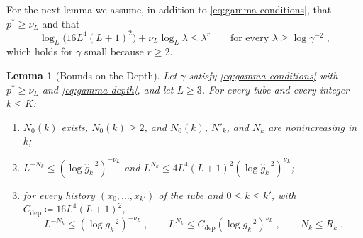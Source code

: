 \documentclass[11pt]{preprint}
\numberwithin{equation}{section}
\newtheorem{lemma}[theorem]{Lemma}
\theoremstyle{definition}
\theoremstyle{remark}
\theoremstyle{plain}
\begin{document}
For the next lemma we assume, in addition to \eqref{eq:gamma-conditions}, that $p^* \geq \nu_L$ and that
\begin{equation}\label{eq:gamma-depth}
    \log_L\bigl(16L^4(L + 1)^2\bigr) + \nu_L\log_L\lambda \leq \lambda^r
    \qquad\text{for every } \lambda \geq \log\gamma^{-2}\;,
\end{equation}
which holds for $\gamma$ small because $r \geq 2$.

\begin{lemma}[Bounds on the Depth]\label{lem:depth}
Let $\gamma$ satisfy \eqref{eq:gamma-conditions} with $p^* \geq \nu_L$ and \eqref{eq:gamma-depth}, and let $L \geq 3$. For every tube and every integer $k \leq K$:
\begin{enumerate}[label=(\roman*)]
\item $N_0(k)$ exists, $N_0(k) \geq 2$, and $N_0(k)$, $N'_k$, and $N_k$ are nonincreasing in $k$;
\item $L^{-N_k} \leq (\log\hat g_k^{-2})^{-\nu_L}$ and $L^{N_k} \leq 4L^4(L + 1)^2(\log\hat g_k^{-2})^{\nu_L}$;
\item for every history $(x_0, \dots, x_{k'})$ of the tube and $0 \leq k \leq k'$, with $C_{\mathrm{dep}} \coloneqq 16L^4(L + 1)^2$,
\begin{equation}\label{eq:depth-bounds}
    L^{-N_k} \leq (\log g_k^{-2})^{-\nu_L}\;,
    \qquad
    L^{N_k} \leq C_{\mathrm{dep}}(\log g_k^{-2})^{\nu_L}\;,
    \qquad
    N_k \leq R_k\;.
\end{equation}
\end{enumerate}
\end{lemma}
\end{document}
